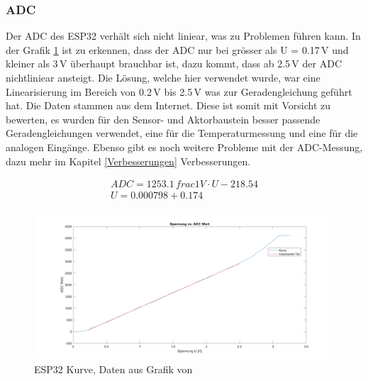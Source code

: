 \subsubsection{ADC} \label{ADC}
Der ADC des ESP32 verhält sich nicht liniear, was zu Problemen führen kann. In der Grafik \ref{pic: ESP32_Kurve} ist zu erkennen, dass der ADC nur bei grösser als U = 0.17\,V und kleiner als 3\,V überhaupt brauchbar ist, dazu kommt, dass ab 2.5\,V der ADC nichtliniear ansteigt. Die Lösung, welche hier verwendet wurde, war eine Linearisierung im Bereich von  0.2\,V bis 2.5\,V was zur Geradengleichung geführt hat. Die Daten stammen aus dem Internet. Diese ist somit mit Vorsicht zu bewerten, es wurden für den Sensor- und Aktorbaustein besser passende Geradengleichungen verwendet, eine für die Temperaturmessung und eine für die analogen Eingänge. Ebenso gibt es noch weitere Probleme mit der ADC-Messung, dazu mehr im Kapitel \ref{Verbesserungen} Verbesserungen.

\begin{align}
ADC = 1253.1\,frac{1}{V}\cdot U - 218.54 \label{ADC_Kurve} \\
U = 0.000798 + 0.174 \label{U_kurve}\\
\end{align}

\begin{figure}[h!]
	\centering
	\includegraphics[width=\textwidth]{graphics/ESP32_Kurve.png}
	\caption{ESP32 Kurve, Daten aus Grafik von \cite{randomnerdtutorials_esp32_2019}}
	\label{pic: ESP32_Kurve}
\end{figure}

